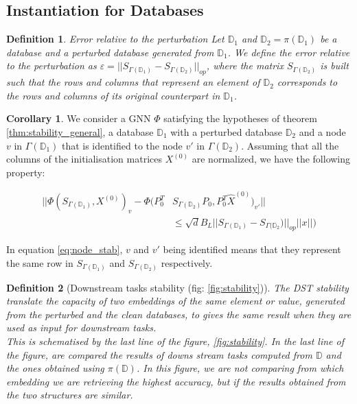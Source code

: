 \documentclass[11pt,a4paper]{article}
\newcommand{\op}[1]{|| #1 ||_{op}}
\newtheorem{definition}{Definition}
\theoremstyle{definition}
\newtheorem{corollary}{Corollary}[theorem]
\renewcommand{\leq}{\leqslant}
\begin{document}
    \subsection{Instantiation for Databases}
     
    \begin{definition}{Error relative to the perturbation}
        Let $\mathbb{D}_1$ and $ \mathbb{D}_2 = \pi(\mathbb{D}_1)$ be a database and a perturbed database generated from $\mathbb{D}_1$. We define the error relative to the perturbation as $\varepsilon =  \op{ S_{\Gamma(\mathbb{D}_1)} - S_{\Gamma(\mathbb{D}_2)} }$, where the matrix $S_{\Gamma(\mathbb{D}_2)}$ is built such that the rows and columns that represent an element of $\mathbb{D}_2$ corresponds to the rows and columns of its original counterpart in $\mathbb{D}_1$.
    \end{definition}


    \begin{corollary}
    
    We consider a GNN $\Phi$ satisfying the hypotheses of theorem \ref{thm:stability_general}, a database $\mathbb{D}_1$ with a perturbed database $\mathbb{D}_2$ and a node $v$ in $\Gamma(\mathbb{D}_1)$ that is identified to the node $v'$ in  $\Gamma(\mathbb{D}_2)$. Assuming that all the columns of the initialisation matrices $X^{(0)}$ are normalized, we have the following property:
    
    \begin{align}
        || \Phi(S_{\Gamma(\mathbb{D}_1)}, X^{(0)})_v - \Phi(P_0^T &S_{\Gamma(\mathbb{D}_2)} P_0, P_0^T \hat{X}^{(0)})_{v'}|| \\
        &\leq \sqrt{d} B_L \op{S_{\Gamma(\mathbb{D}_1)} - S_{\Gamma(\mathbb{D}_2})} ||x||)
    \end{align}

    In equation \ref{eq:node_stab},  $v$ and $v'$ being identified means that they represent the same row in $S_{\Gamma (\mathbb{D}_1)}$ and $S_{\Gamma(\mathbb{D}_2)}$ respectively. 
    \end{corollary}

\begin{definition}[Downstream tasks stability (fig: \ref{fig:stability})]
    The DST stability translate the capacity of two embeddings of the same element or value, generated from the perturbed and the clean databases, to gives the same result when they are used as input for downstream tasks.\\

    This is schematised by the last line of the figure, \ref{fig:stability}. In the last line of the figure, are compared the results of downs stream tasks computed from $\mathbb{D}$ and the ones obtained using $\pi (\mathbb{D})$. In this figure, we are not comparing from which embedding we are retrieving the highest accuracy, but if the results obtained from the two structures are similar. 
\end{definition}
\end{document}
